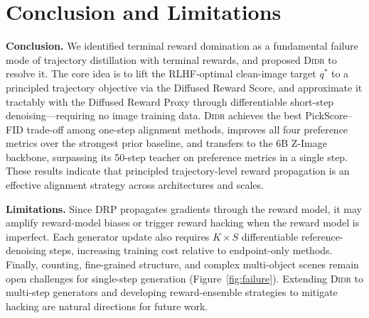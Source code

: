 \section{Conclusion and Limitations}
\vspace{-3mm}

\textbf{Conclusion.} We identified terminal reward domination as a fundamental failure mode of trajectory distillation with terminal rewards, and proposed \textsc{Didr} to resolve it. The core idea is to lift the RLHF-optimal clean-image target $q^*$ to a principled trajectory objective via the Diffused Reward Score, and approximate it tractably with the Diffused Reward Proxy through differentiable short-step denoising---requiring no image training data. \textsc{Didr} achieves the best PickScore--FID trade-off among one-step alignment methods, improves all four preference metrics over the strongest prior baseline, and transfers to the 6B Z-Image backbone, surpassing its 50-step teacher on preference metrics in a single step. These results indicate that principled trajectory-level reward propagation is an effective alignment strategy across architectures and scales.

\textbf{Limitations.} Since DRP propagates gradients through the reward model, it may amplify reward-model biases or trigger reward hacking when the reward model is imperfect. Each generator update also requires $K \times S$ differentiable reference-denoising steps, increasing training cost relative to endpoint-only methods. Finally, counting, fine-grained structure, and complex multi-object scenes remain open challenges for single-step generation (Figure~\ref{fig:failure}). Extending \textsc{Didr} to multi-step generators and developing reward-ensemble strategies to mitigate hacking are natural directions for future work.
